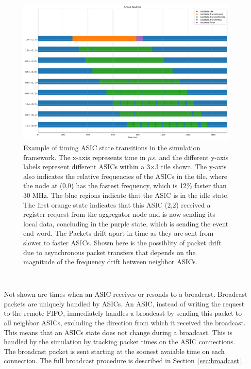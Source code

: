 \begin{figure}[]
\centering
\includegraphics[width=\textwidth]{images/snake_timer.pdf}
\caption{Example of timing ASIC state transitions in the simulation framework.
  The x-axis represents time in $\mu s$, and the different y-axis labels represent different ASICs within a 3$\times$3 tile shown.
  The y-axis also indicates the relative frequencies of the ASICs in the tile, where the node at (0,0) has the fastest frequency, which is 12\% faster than 30 MHz.
  The blue regions indicate that the ASIC is in the idle state.
  The first orange state indicates that this ASIC (2,2) received a register request from the aggregator node and is now sending its local data, concluding in the purple state, which is sending the event end word.
  The Packets drift apart in time as they are sent from slower to faster ASICs.
  Shown here is the possiblity of packet drift due to asynchronous packet transfers that depends on the magnitude of the frequency drift between neighbor ASICs.
}
\end{figure}~\label{fig:snake_packet_drift}

Not shown are times when an ASIC receives or resonds to a broadcast.
Broadcast packets are uniquely handled by ASICs.
An ASIC, instead of writing the request to the remote FIFO, immediately handles a broadcast by sending this packet to all neighbor ASICs, excluding the direction from which it received the broadcast.
This means that an ASICs state does not change during a broadcast.
This is handled by the simulation by tracking packet times on the ASIC connections.
The broadcast packet is sent starting at the soonest avaiable time on each connection.
The full broadcast procedure is described in Section~\ref{sec:broadcast}.


